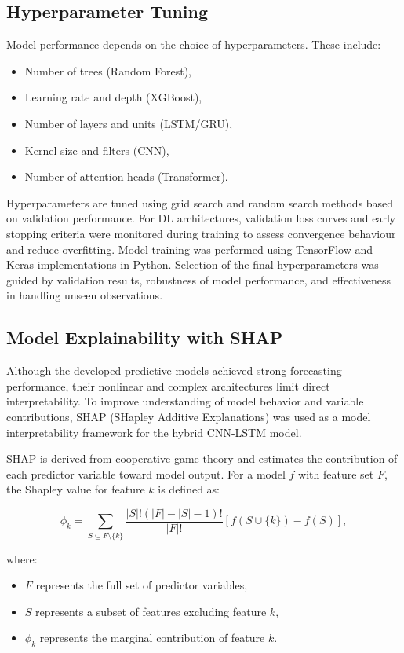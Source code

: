 	\subsection{Hyperparameter Tuning}
	Model performance depends on the choice of hyperparameters. These include:
	
	\begin{itemize}
		\item Number of trees (Random Forest),
		\item Learning rate and depth (XGBoost),
		\item Number of layers and units (LSTM/GRU),
		\item Kernel size and filters (CNN),
		\item Number of attention heads (Transformer).
	\end{itemize}
	
	Hyperparameters are tuned using grid search and random search methods based on validation performance. For DL architectures, validation loss curves and early stopping criteria were monitored during training to assess convergence behaviour and reduce overfitting. Model training was performed using TensorFlow and Keras implementations in Python. Selection of the final hyperparameters was guided by validation results, robustness of model performance, and effectiveness in handling unseen observations.
	
    \subsection{Model Explainability with SHAP}
     \label{sec:shap_analysis}

Although the developed predictive models achieved strong forecasting performance, their nonlinear and complex architectures limit direct interpretability. To improve understanding of model behavior and variable contributions, SHAP (SHapley Additive Explanations) was used as a model interpretability framework for the hybrid CNN-LSTM model.

SHAP is derived from cooperative game theory and estimates the contribution of each predictor variable toward model output. For a model \(f\) with feature set \(F\), the Shapley value for feature \(k\) is defined as:

\[
\phi_k = \sum_{S \subseteq F \setminus \{k\}}
\frac{|S|!(|F|-|S|-1)!}{|F|!}
\left[
f(S \cup \{k\}) - f(S)
\right],
\]

where:
\begin{itemize}
	\item \(F\) represents the full set of predictor variables,
	\item \(S\) represents a subset of features excluding feature \(k\),
	\item \(\phi_k\) represents the marginal contribution of feature \(k\).
\end{itemize}

